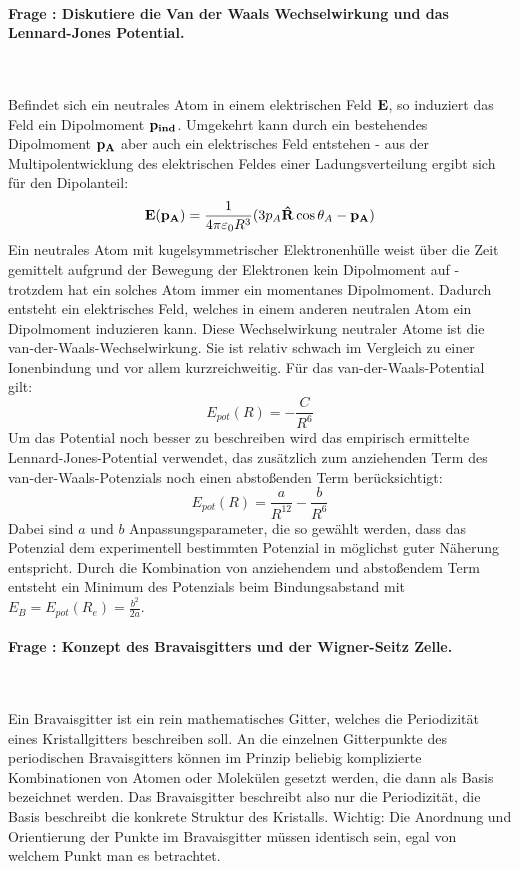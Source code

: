 \documentclass[a4paper, 11pt, ngerman, parskip=half-]{scrartcl}
\newcounter{question}
\newcommand{\question}[1]{\stepcounter{question}\paragraph{Frage \thequestion: #1}~}
\begin{document}
\question{Diskutiere die Van der Waals Wechselwirkung und das Lennard-Jones Potential.}
\label{q:53}

Befindet sich ein neutrales Atom in einem elektrischen Feld $\vb{E}$, so induziert das Feld ein Dipolmoment $\vb{p_{ind}}$. Umgekehrt kann durch ein bestehendes Dipolmoment $\vb{p_A}$ aber auch ein elektrisches Feld entstehen - aus der Multipolentwicklung des elektrischen Feldes einer Ladungsverteilung ergibt sich für den Dipolanteil:
\begin{equation*}
    \vb{E}(\vb{p_A}) = \frac{1}{4\pi\varepsilon_0 R^3} (3 p_A \vb{\hat{R}} \cos{\theta_A} - \vb{p_A})
\end{equation*}
Ein neutrales Atom mit kugelsymmetrischer Elektronenhülle weist über die Zeit gemittelt aufgrund der Bewegung der Elektronen kein Dipolmoment auf - trotzdem hat ein solches Atom immer ein momentanes Dipolmoment. Dadurch entsteht ein elektrisches Feld, welches in einem anderen neutralen Atom ein Dipolmoment induzieren kann. Diese Wechselwirkung neutraler Atome ist die van-der-Waals-Wechselwirkung. Sie ist relativ schwach im Vergleich zu einer Ionenbindung und vor allem kurzreichweitig. Für das van-der-Waals-Potential gilt:
\begin{equation*}
    E_{pot}(R) = -\frac{C}{R^6}
\end{equation*}
Um das Potential noch besser zu beschreiben wird das empirisch ermittelte Lennard-Jones-Potential verwendet, das zusätzlich zum anziehenden Term des van-der-Waals-Potenzials noch einen abstoßenden Term berücksichtigt:
\begin{equation*}
    E_{pot}(R) = \frac{a}{R^{12}} - \frac{b}{R^6}
\end{equation*}
Dabei sind $a$ und $b$ Anpassungsparameter, die so gewählt werden, dass das Potenzial dem experimentell bestimmten Potenzial in möglichst guter Näherung entspricht. Durch die Kombination von anziehendem und abstoßendem Term entsteht ein Minimum des Potenzials beim Bindungsabstand mit $E_B = E_{pot}(R_e) = \frac{b^2}{2a}$.


\question{Konzept des Bravaisgitters und der Wigner-Seitz Zelle.}
\label{q:54}

Ein Bravaisgitter ist ein rein mathematisches Gitter, welches die Periodizität eines Kristallgitters beschreiben soll. An die einzelnen Gitterpunkte des periodischen Bravaisgitters können im Prinzip beliebig komplizierte Kombinationen von Atomen oder Molekülen gesetzt werden, die dann als Basis bezeichnet werden. Das Bravaisgitter beschreibt also nur die Periodizität, die Basis beschreibt die konkrete Struktur des Kristalls. Wichtig: Die Anordnung und Orientierung der Punkte im Bravaisgitter müssen identisch sein, egal von welchem Punkt man es betrachtet.
\end{document}
